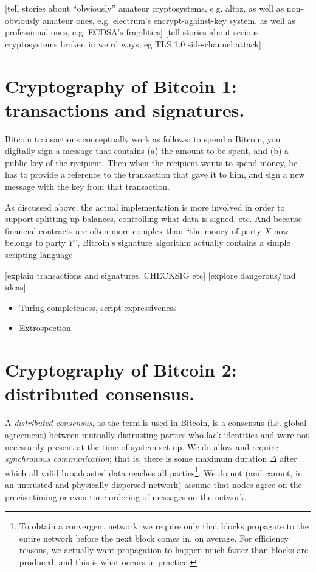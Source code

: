 \documentclass[letterpaper]{article}
\begin{document}
[tell stories about ``obviously'' amateur cryptosystems, e.g. altoz, as well
as non-obviously amateur ones, e.g. electrum's encrypt-against-key system,
as well as professional ones, e.g. ECDSA's fragilities]
[tell stories about serious cryptosystems broken in weird ways, eg TLS 1.0 side-channel attack]

\section{Cryptography of Bitcoin 1: transactions and signatures. \label{txes}}

Bitcoin transactions conceptually work as follows: to spend a Bitcoin, you
digitally sign a message that contains (a) the amount to be spent, and (b)
a public key of the recipient. Then when the recipient wants to spend money,
he has to provide a reference to the transaction that gave it to him, and
sign a new message with the key from that transaction.

As discussed above, the actual implementation is more involved in order to
support splitting up balances, controlling what data is signed, etc. And
because financial contracts are often more complex than ``the money of
party $X$ now belongs to party $Y$'', Bitcoin's signature algorithm actually
contains a simple scripting language

[explain transactions and signatures, CHECKSIG etc]
[explore dangerous/bad ideas]
\begin{itemize}
\item Turing completeness, script expressiveness
\item Extrospection
\end{itemize}

\section{Cryptography of Bitcoin 2: distributed consensus.\label{consensus}}

A \emph{distributed consensus}, as the term is used in Bitcoin, is a consensus (i.e.
global agreement) between mutually-distrusting parties who lack identities and were
not necessarily present at the time of system set up. We do allow and require
\emph{synchronous communication}; that is, there is some maximum duration $\Delta$
after which all valid broadcasted data reaches all parties\footnote{To obtain a
convergent network, we require only that blocks propagate to the entire network
before the next block comes in, on average. For efficiency reasons, we actually
want propagation to happen much faster than blocks are produced, and this is what
occurs in practice.}\cite{miller+laviola2014}. We do not (and cannot, in an untrusted
and physically dispersed network) assume that nodes agree on the precise timing or
even time-ordering of messages on the network.
\end{document}
